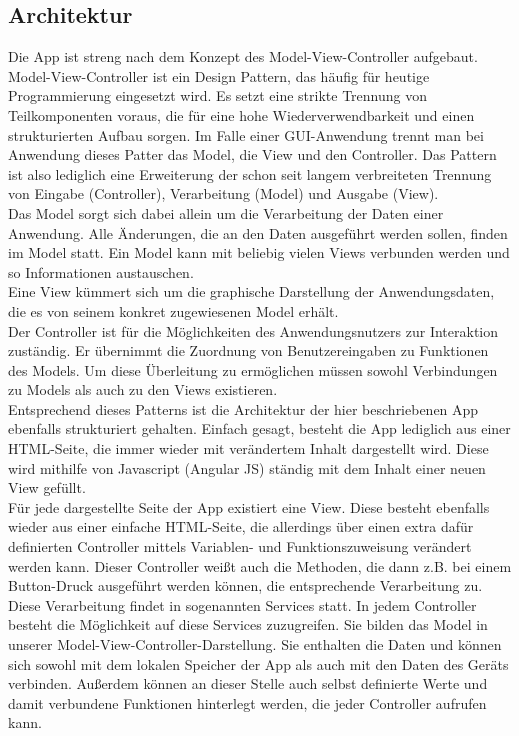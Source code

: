 \subsection{Architektur}
Die App ist streng nach dem Konzept des Model-View-Controller aufgebaut.
\\
Model-View-Controller ist ein Design Pattern, das häufig für heutige Programmierung eingesetzt wird. Es setzt eine strikte Trennung von Teilkomponenten voraus, die für eine hohe Wiederverwendbarkeit und einen strukturierten Aufbau sorgen. Im Falle einer GUI-Anwendung trennt man bei Anwendung dieses Patter das Model, die View und den Controller. Das Pattern ist also lediglich eine Erweiterung der schon seit langem verbreiteten Trennung von Eingabe (Controller), Verarbeitung (Model) und Ausgabe (View). 
\\
Das Model sorgt sich dabei allein um die Verarbeitung der Daten einer Anwendung. Alle Änderungen, die an den Daten ausgeführt werden sollen, finden im Model statt. Ein Model kann mit beliebig vielen Views verbunden werden und so Informationen austauschen. 
\\
Eine View kümmert sich um die graphische Darstellung der Anwendungsdaten, die es von seinem konkret zugewiesenen Model erhält. 
\\
Der Controller ist für die Möglichkeiten des Anwendungsnutzers zur Interaktion zuständig. Er übernimmt die Zuordnung von Benutzereingaben zu Funktionen des Models. Um diese Überleitung zu ermöglichen müssen sowohl Verbindungen zu Models als auch zu den Views existieren.
\\
Entsprechend dieses Patterns ist die Architektur der hier beschriebenen App ebenfalls strukturiert gehalten. Einfach gesagt, besteht die App lediglich aus einer HTML-Seite, die immer wieder mit verändertem Inhalt dargestellt wird. Diese wird mithilfe von Javascript (Angular JS) ständig mit dem Inhalt einer neuen View gefüllt.
\\
Für jede dargestellte Seite der App existiert eine View. Diese besteht ebenfalls wieder aus einer einfache HTML-Seite, die allerdings über einen extra dafür definierten Controller mittels Variablen- und Funktionszuweisung verändert werden kann. Dieser Controller weißt auch die Methoden, die dann z.B. bei einem Button-Druck ausgeführt werden können, die entsprechende Verarbeitung zu.
\\
Diese Verarbeitung findet in sogenannten Services statt. In jedem Controller besteht die Möglichkeit auf diese Services zuzugreifen. Sie bilden das Model in unserer Model-View-Controller-Darstellung. Sie enthalten die Daten und können sich sowohl mit dem lokalen Speicher der App als auch mit den Daten des Geräts verbinden. Außerdem können an dieser Stelle auch selbst definierte Werte und damit verbundene Funktionen hinterlegt werden, die jeder Controller aufrufen kann.
